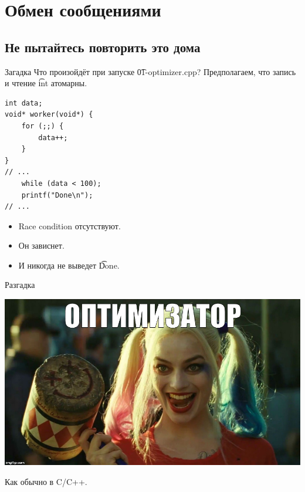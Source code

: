 \section{Обмен сообщениями}
\subsection{Не пытайтесь повторить это дома}

\begin{frame}
\end{frame}

\begin{frame}[fragile]{Загадка}
	Что произойдёт при запуске \t{01-optimizer.cpp}?
	Предполагаем, что запись и чтение \t{int} атомарны.
\begin{verbatim}
int data;
void* worker(void*) {
    for (;;) {
        data++;
    }
}
// ...
    while (data < 100);
    printf("Done\n");
// ...
\end{verbatim}
	\begin{itemize}
		\pause\item Race condition отсутствуют.
		\pause\item Он зависнет.
		\pause\item И никогда не выведет \t{Done}.
	\end{itemize}
\end{frame}

\begin{frame}{Разгадка}
	\begin{center}
		\includegraphics[scale=0.3]{optimizer.jpg}
	\end{center}
	Как обычно в C/C++.
\end{frame}

